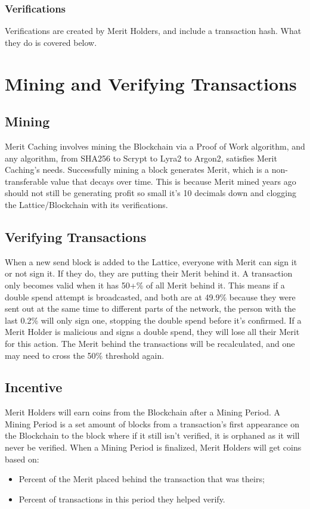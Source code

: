 \documentclass[14pt]{article}
\begin{document}
\subsubsection{Verifications}
Verifications are created by Merit Holders, and include a transaction hash. What they do is covered below.

\newpage

\section{Mining and Verifying Transactions}

\subsection{Mining}
Merit Caching involves mining the Blockchain via a Proof of Work algorithm, and any algorithm, from SHA256 to Scrypt to Lyra2 to Argon2, satisfies Merit Caching's needs. Successfully mining a block generates Merit, which is a non-transferable value that decays over time. This is because Merit mined years ago should not still be generating profit so small it's 10 decimals down and clogging the Lattice/Blockchain with its verifications.

\subsection{Verifying Transactions}
When a new send block is added to the Lattice, everyone with Merit can sign it or not sign it. If they do, they are putting their Merit behind it. A transaction only becomes valid when it has 50+\% of all Merit behind it. This means if a double spend attempt is broadcasted, and both are at 49.9\% because they were sent out at the same time to different parts of the network, the person with the last 0.2\% will only sign one, stopping the double spend before it's confirmed. If a Merit Holder is malicious and signs a double spend, they will lose all their Merit for this action. The Merit behind the transactions will be recalculated, and one may need to cross the 50\% threshold again.

\newpage

\subsection{Incentive}
Merit Holders will earn coins from the Blockchain after a Mining Period. A Mining Period is a set amount of blocks from a transaction's first appearance on the Blockchain to the block where if it still isn't verified, it is orphaned as it will never be verified. When a Mining Period is finalized, Merit Holders will get coins based on:
\begin{itemize}
\item Percent of the Merit placed behind the transaction that was theirs;
\item Percent of transactions in this period they helped verify.
\end{itemize}
\end{document}

